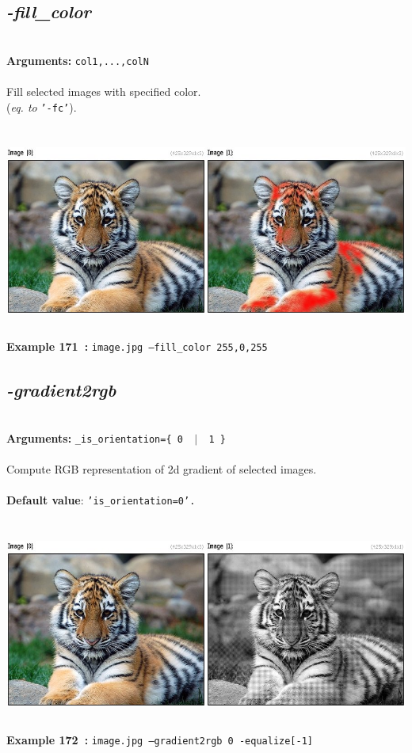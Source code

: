 \documentclass[a4paper,11pt,twoside]{book}
\begin{document}
\subsection{\emph{-fill\_color} }\vspace*{-0.5em}
~\\\textbf{Arguments: } 
{\small \texttt{col1,...,colN}}\\~\\
Fill selected images with specified color.
~\\(\emph{eq. to} {\small \texttt{'-fc'}}).
\begin{center}\includegraphics[keepaspectratio=true,height=7cm,width=\textwidth]{img/gmic_def171.jpg}\\
{\footnotesize \textbf{Example 171~:} \texttt{image.jpg --fill\_color 255,0,255}}
\end{center}

\subsection{\emph{-gradient2rgb} }\vspace*{-0.5em}
~\\\textbf{Arguments: } 
{\small \texttt{\_is\_orientation=\{ 0 ~$|$~ 1 \}}}\\~\\
Compute RGB representation of 2d gradient of selected images.
~\\~\\\textbf{Default value}: {\small \texttt{'is\_orientation=0'.}}
\begin{center}\includegraphics[keepaspectratio=true,height=7cm,width=\textwidth]{img/gmic_def172.jpg}\\
{\footnotesize \textbf{Example 172~:} \texttt{image.jpg --gradient2rgb 0 -equalize[-1]}}
\end{center}
\end{document}
